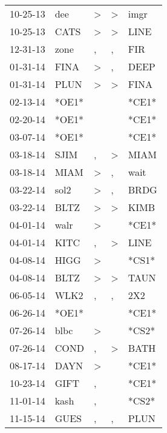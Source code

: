 \begin{supertabular}{lllll}
 10-25-13 &    dee &     \textgreater &     \textgreater &   imgr \\
 10-25-13 &   CATS &     \textgreater &     \textgreater &   LINE \\
 12-31-13 &   zone &                , &                , &    FIR \\
 01-31-14 &   FINA &     \textgreater &                , &   DEEP \\
 01-31-14 &   PLUN &     \textgreater &     \textgreater &   FINA \\
 02-13-14 &  *OE1* &                  &                  &  *CE1* \\
 02-20-14 &  *OE1* &                  &                  &  *CE1* \\
 03-07-14 &  *OE1* &                  &                  &  *CE1* \\
 03-18-14 &   SJIM &                , &     \textgreater &   MIAM \\
 03-18-14 &   MIAM &     \textgreater &                , &   wait \\
 03-22-14 &   sol2 &     \textgreater &                , &   BRDG \\
 03-22-14 &   BLTZ &     \textgreater &     \textgreater &   KIMB \\
 04-01-14 &   walr &     \textgreater &                  &  *CE1* \\
 04-01-14 &   KITC &                , &     \textgreater &   LINE \\
 04-08-14 &   HIGG &     \textgreater &                  &  *CS1* \\
 04-08-14 &   BLTZ &     \textgreater &     \textgreater &   TAUN \\
 06-05-14 &   WLK2 &                , &                , &    2X2 \\
 06-26-14 &  *OE1* &                  &                  &  *CE1* \\
 07-26-14 &   blbc &     \textgreater &                  &  *CS2* \\
 07-26-14 &   COND &                , &     \textgreater &   BATH \\
 08-17-14 &   DAYN &     \textgreater &                  &  *CE1* \\
 10-23-14 &   GIFT &                , &                  &  *CE1* \\
 11-01-14 &   kash &                , &                  &  *CS2* \\
 11-15-14 &   GUES &                , &                , &   PLUN \\

\end{supertabular}
